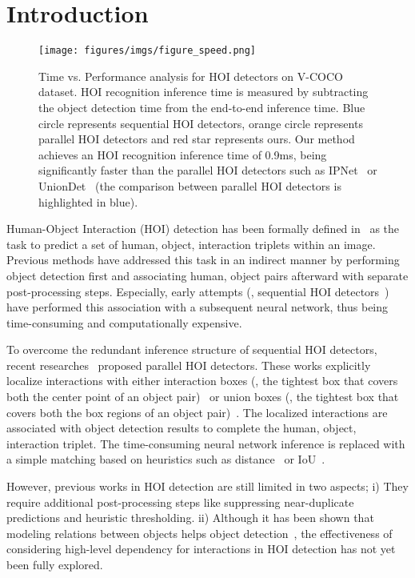 \documentclass[final]{cvpr}
\begin{document}
\section{Introduction}
\begin{figure}
    \centering
    \texttt{[image: figures/imgs/figure\_speed.png]}
    \caption{Time vs. Performance analysis for HOI detectors on V-COCO dataset. HOI recognition inference time is measured by subtracting the object detection time from the end-to-end inference time.
    {\color{blue}Blue circle} represents sequential HOI detectors, {\color{orange}orange circle} represents parallel HOI detectors and {\color{red}red star} represents ours.
    Our method achieves an HOI recognition inference time of 0.9ms, being significantly faster than the parallel HOI detectors such as IPNet~\cite{wang2020learning} or UnionDet~\cite{bkim2020uniondet} (the comparison between parallel HOI detectors is highlighted in blue).
    }
    \label{fig:fig_speed}
\end{figure} 
Human-Object Interaction (HOI) detection has been formally defined in~\cite{gupta2015visual} as the task to predict a set of human, object, interaction triplets within an image.
Previous methods have addressed this task in an indirect manner by performing object detection first and associating human, object pairs afterward with separate post-processing steps.
Especially, early attempts (\ie, sequential HOI detectors~\cite{gao2018ican,li2019transferable,li2020pastanet,ulutan2020vsgnet}) have performed this association with a subsequent neural network, thus being time-consuming and computationally expensive.

To overcome the redundant inference structure of sequential HOI detectors, recent researches~\cite{wang2020learning,liao2020ppdm,bkim2020uniondet} proposed parallel HOI detectors.
These works explicitly localize interactions with either interaction boxes (\ie, the tightest box that covers both the center point of an object pair)~\cite{wang2020learning,liao2020ppdm} or union boxes (\ie, the tightest box that covers both the box regions of an object pair)~\cite{bkim2020uniondet}.
The localized interactions are associated with object detection results to complete the human, object, interaction triplet.
The time-consuming neural network inference is replaced with a simple matching based on heuristics such as distance~\cite{wang2020learning,liao2020ppdm} or IoU~\cite{bkim2020uniondet}.

However, previous works in HOI detection are still limited in two aspects;
i) They require additional post-processing steps like suppressing near-duplicate predictions and heuristic thresholding. ii) Although it has been shown that modeling relations between objects helps object detection~\cite{hu2018relation,carion2020end}, the effectiveness of considering high-level dependency for interactions in HOI detection has not yet been fully explored.
\end{document}
